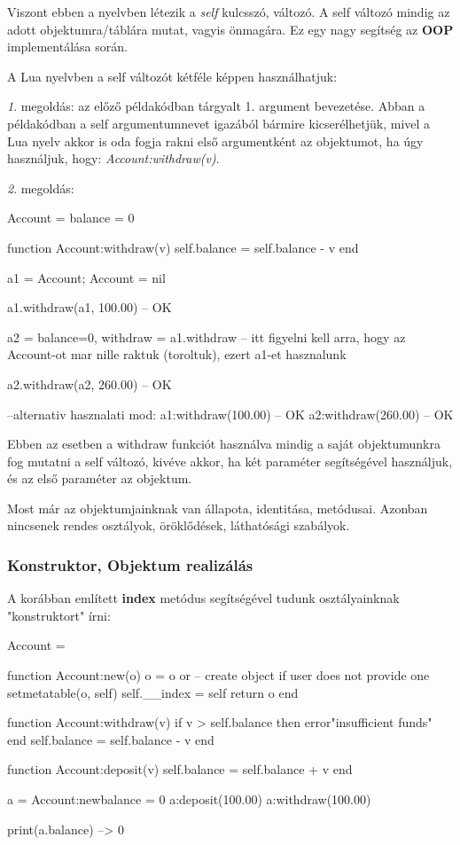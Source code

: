 Viszont ebben a nyelvben létezik a \textit{self} kulcsszó, változó. A self változó mindig az adott objektumra/táblára mutat, vagyis önmagára. Ez egy nagy segítség az \textbf{OOP} implementálása során.

\pagebreak
A Lua nyelvben a self változót kétféle képpen használhatjuk:

\hspace{10mm}\textit{1}. megoldás: az előző példakódban tárgyalt 1. argument bevezetése. Abban a példakódban a self argumentumnevet igazából bármire kicserélhetjük, mivel a Lua nyelv akkor is oda fogja rakni első argumentként az objektumot, ha úgy használjuk, hogy: \textit{Account:withdraw(v)}.

\hspace{10mm}\textit{2}. megoldás:
\begin{lua}
Account = {balance = 0}

function Account:withdraw(v)
	self.balance = self.balance - v
end

a1 = Account; Account = nil

a1.withdraw(a1, 100.00)   -- OK

a2 = {balance=0, withdraw = a1.withdraw} -- itt figyelni kell arra, hogy az Account-ot mar nille raktuk (toroltuk), ezert a1-et hasznalunk 

a2.withdraw(a2, 260.00) -- OK

--alternativ hasznalati mod:
a1:withdraw(100.00) -- OK
a2:withdraw(260.00) -- OK
\end{lua}
Ebben az esetben a withdraw funkciót használva mindig a saját objektumunkra fog mutatni a self változó, kivéve akkor, ha két paraméter segítségével használjuk, és az első paraméter az objektum.

Most már az objektumjainknak van állapota, identitása, metódusai. Azonban nincsenek rendes osztályok, öröklődések, láthatósági szabályok.\pagebreak
\subsubsection{Konstruktor, Objektum realizálás}
A korábban említett \detokenize{__}\textbf{index} metódus segítségével tudunk osztályainknak "konstruktort" írni:
\begin{lua}
Account = {}

function Account:new(o)
	o = o or {}   -- create object if user does not provide one
	setmetatable(o, self)
	self.__index = self
	return o
end

function Account:withdraw(v)
	if v > self.balance then error"insufficient funds" end
	self.balance = self.balance - v
end

function Account:deposit(v)
	self.balance = self.balance + v
end

a = Account:new{balance = 0}
a:deposit(100.00)
a:withdraw(100.00)

print(a.balance) --> 0
\end{lua}

